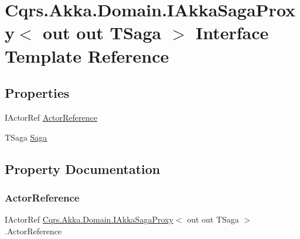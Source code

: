 \hypertarget{interfaceCqrs_1_1Akka_1_1Domain_1_1IAkkaSagaProxy}{}\section{Cqrs.\+Akka.\+Domain.\+I\+Akka\+Saga\+Proxy$<$ out out T\+Saga $>$ Interface Template Reference}
\label{interfaceCqrs_1_1Akka_1_1Domain_1_1IAkkaSagaProxy}
\subsection*{Properties}
\begin{DoxyCompactItemize}
\item 
I\+Actor\+Ref \hyperlink{interfaceCqrs_1_1Akka_1_1Domain_1_1IAkkaSagaProxy_a8edb3e9332787ee3a9059589c85ed9e5}{Actor\+Reference}
\item 
T\+Saga \hyperlink{interfaceCqrs_1_1Akka_1_1Domain_1_1IAkkaSagaProxy_adc230a1e98a8f4ed88a4230e0d0702e1}{Saga}
\end{DoxyCompactItemize}


\subsection{Property Documentation}
\mbox{\label{interfaceCqrs_1_1Akka_1_1Domain_1_1IAkkaSagaProxy_a8edb3e9332787ee3a9059589c85ed9e5}} 
\subsubsection{\texorpdfstring{Actor\+Reference}{ActorReference}}
{\footnotesize\ttfamily I\+Actor\+Ref \hyperlink{interfaceCqrs_1_1Akka_1_1Domain_1_1IAkkaSagaProxy}{Cqrs.\+Akka.\+Domain.\+I\+Akka\+Saga\+Proxy}$<$ out out T\+Saga $>$.Actor\+Reference\hspace{0.3cm}{\ttfamily [get]}}

